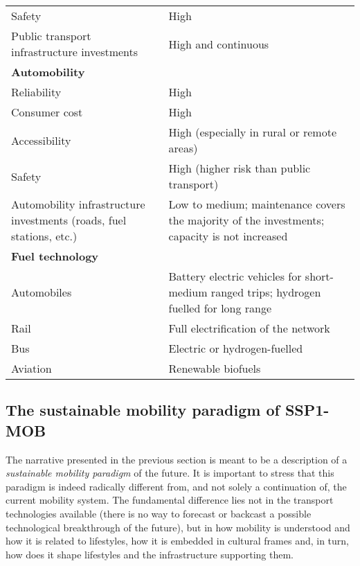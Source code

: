 \begin{table}
\begin{tabular}{p{4.5cm}p{9cm}}
Safety & High \\
Public transport infrastructure investments & High and continuous \\\addlinespace
\textbf{Automobility} &  \\
Reliability & High \\
Consumer cost & High \\
Accessibility & High (especially in rural or remote areas) \\
Safety & High (higher risk than public transport) \\
Automobility infrastructure investments (roads, fuel stations, etc.) & Low to medium; maintenance covers the majority of the investments; capacity is not increased \\\addlinespace
\textbf{Fuel technology} &  \\
Automobiles & Battery electric vehicles for short-medium ranged trips; hydrogen fuelled for long range \\
Rail & Full electrification of the network \\
Bus & Electric or hydrogen-fuelled \\
Aviation & Renewable biofuels \\ \bottomrule
\end{tabular}
\end{table}

\subsection{The sustainable mobility paradigm of SSP1-MOB}
\label{ss:results:ssp1-mob-paradigm}
The narrative presented in the previous section is meant to be a description of a \emph{sustainable mobility paradigm} of the future. It is important to stress that this paradigm is indeed radically different from, and not solely a continuation of, the current mobility system. The fundamental difference lies not in the transport technologies available (there is no way to forecast or backcast a possible technological breakthrough of the future), but in how mobility is understood and how it is related to lifestyles, how it is embedded in cultural frames and, in turn, how does it shape lifestyles and the infrastructure supporting them.

